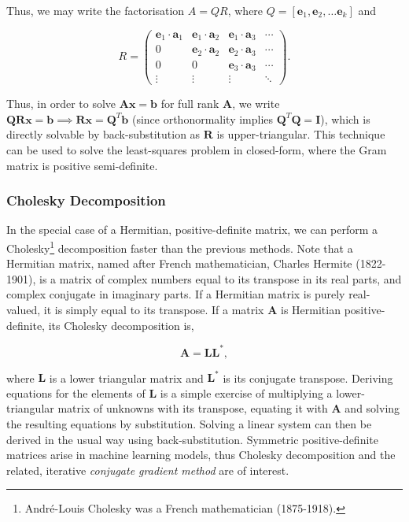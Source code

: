 \documentclass[11pt]{amsart}
\begin{document}
Thus, we may write the factorisation $A = QR$, where $Q = [\mathbf{e}_1, \mathbf{e}_2, \dots \mathbf{e}_k]$ and

$$R = 
\begin{pmatrix}
\mathbf{e}_1 \cdot \mathbf{a}_1&\mathbf{e}_1 \cdot \mathbf{a}_2&\mathbf{e}_1 \cdot \mathbf{a}_3&\cdots\\
0&\mathbf{e}_2 \cdot \mathbf{a}_2&\mathbf{e}_2 \cdot \mathbf{a}_3&\cdots\\
0&0&\mathbf{e}_3 \cdot \mathbf{a}_3&\cdots\\
\vdots&\vdots&\vdots&\ddots
\end{pmatrix}.
$$

Thus, in order to solve $\mathbf{A}\mathbf{x} = \mathbf{b}$ for full rank $\mathbf{A}$, we write $\mathbf{Q}\mathbf{R}\mathbf{x} = \mathbf{b} \implies \mathbf{R}\mathbf{x} = \mathbf{Q}^T\mathbf{b}$ (since orthonormality implies $\mathbf{Q}^T\mathbf{Q} = \mathbf{I}$), which is directly solvable by back-substitution as $\mathbf{R}$ is upper-triangular. This technique can be used to solve the least-squares problem in closed-form, where the Gram matrix is positive semi-definite.

\subsubsection{Cholesky Decomposition}

In the special case of a Hermitian, positive-definite matrix, we can perform a Cholesky\footnote{Andr\'e-Louis Cholesky was a French mathematician (1875-1918).} decomposition faster than the previous methods. Note that a Hermitian matrix, named after French mathematician, Charles Hermite (1822-1901), is a matrix of complex numbers equal to its transpose in its real parts, and complex conjugate in imaginary parts. If a Hermitian matrix is purely real-valued, it is simply equal to its transpose. If a matrix $\mathbf{A}$ is Hermitian positive-definite, its Cholesky decomposition is,

$$\mathbf{A} = \mathbf{L}\mathbf{L}^*,$$

where $\mathbf{L}$ is a lower triangular matrix and $\mathbf{L}^*$ is its conjugate transpose. Deriving equations for the elements of $\mathbf{L}$ is a simple exercise of multiplying a lower-triangular matrix of unknowns with its transpose, equating it with $\mathbf{A}$ and solving the resulting equations by substitution. Solving a linear system can then be derived in the usual way using back-substitution. Symmetric positive-definite matrices arise in machine learning models, thus Cholesky decomposition and the related, iterative \emph{conjugate gradient method} are of interest.
\end{document}
